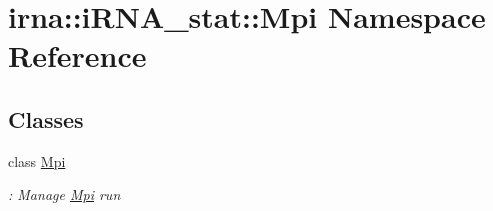 \hypertarget{namespaceirna_1_1iRNA__stat_1_1Mpi}{
\section{irna\-:\-:i\-R\-N\-A\-\_\-stat\-:\-:\-Mpi \-Namespace \-Reference}
\label{namespaceirna_1_1iRNA__stat_1_1Mpi}
}
\subsection*{\-Classes}
\begin{DoxyCompactItemize}
\item 
class \hyperlink{classirna_1_1iRNA__stat_1_1Mpi_1_1Mpi}{\-Mpi}
\begin{DoxyCompactList}\small\item\em \-: \-Manage \hyperlink{classirna_1_1iRNA__stat_1_1Mpi_1_1Mpi}{\-Mpi} run \end{DoxyCompactList}\end{DoxyCompactItemize}
